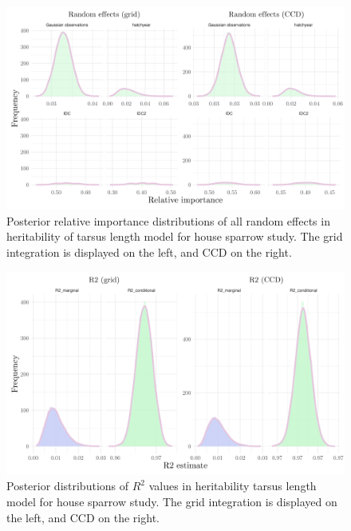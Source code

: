 \begin{figure}[H]%
  \centering
  \includegraphics[width=1\linewidth]{Figures/House sparrow study/Tarsus_random.png}
  \caption[Posterior relative importance distributions of all random effects in tarsus length model for house sparrow study]{Posterior relative importance distributions of all random effects in heritability of tarsus length model for house sparrow study. The grid integration is displayed on the left, and CCD on the right.}
  \label{fig:tarsus_random_sparrows}
\end{figure}

\begin{figure}[H]%
  \centering
  \includegraphics[width=1\linewidth]{Figures/House sparrow study/Tarsus_r2.png}
  \caption[Posterior distributions of $R^2$ values in tarsus length model for house sparrow study]{Posterior distributions of $R^2$ values in heritability tarsus length model for house sparrow study. The grid integration is displayed on the left, and CCD on the right.}
  \label{fig:tarsus_r2}
\end{figure}

